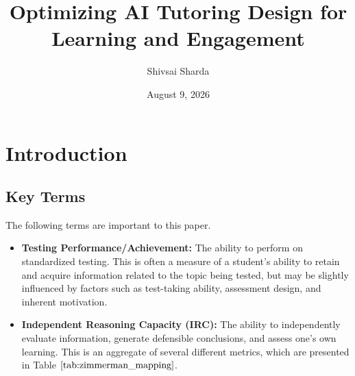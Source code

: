 \documentclass[12pt]{article}
\begin{document}
\title{Optimizing AI Tutoring Design for Learning and Engagement}
\author{Shivsai Sharda}
\date{August 9, 2026}
\maketitle
\tableofcontents
\newpage

\section{Introduction}
\subsection{Key Terms}
The following terms are important to this paper.
\begin{itemize}
    \item \textbf{Testing Performance/Achievement:} The ability to perform on standardized testing. This is often a measure of a student's ability to retain and acquire information related to the topic being tested, but may be slightly influenced by factors such as test-taking ability, assessment design, and inherent motivation.
    \item \textbf{Independent Reasoning Capacity (IRC):} The ability to independently evaluate information, generate defensible conclusions, and assess one's own learning. This is an aggregate of several different metrics, which are presented in Table $\ref{tab:zimmerman_mapping}$.
\end{itemize}
\end{document}
